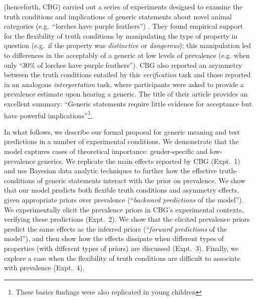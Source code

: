 \documentclass[10pt,letterpaper]{article}
\begin{document}
 (henceforth, CBG) carried out a series of experiments designed to examine the truth conditions and implications of generic statements about novel animal categories (e.g.~``lorches have purple feathers'') . 
They found empirical support for the flexibility of truth conditions by manipulating the type of property in question (e.g.~if the property was \emph{distinctive} or \emph{dangerous}); this manipulation led to differences in the acceptably of a generic at low levels of prevalence (e.g. when only ``30\% of lorches have purple feathers'').
%
CBG also reported an asymmetry between the truth conditions entailed by this \emph{verification} task and those reported in an analogous \emph{interpretation} task, where participants were asked to provide a prevalence estimate upon hearing a generic. The title of their article provides an excellent summary: ``Generic statements require little evidence for acceptance but have powerful implications''\footnote{These basics findings were also replicated in young children\cite{Brandone2014}}.

In what follows, we describe our formal proposal for generic meaning and test predictions in a number of experimental conditions. We demonstrate that the model captures cases of theoretical importance: gender-specific and low-prevalence generics. We replicate the main effects reported by CBG (Expt.~1) and use Bayesian data analytic techniques to further how the effective truth-conditions of generic statements interact with the prior on prevalence. We show that our model predicts both flexible truth conditions and asymmetry effects, given appropriate priors over prevalence (``\emph{backward predictions} of the model''). We experimentally elicit the prevalence priors in CBG's experimental contexts, verifying these predictions (Expt.~2). We show that the elicited prevalence priors predict the same effects as the inferred priors (``\emph{forward predictions} of the model''), and then show how the effects dissipate when different types of properties (with different types of priors) are discussed (Expt.~3). Finally, we explore a case when the flexibility of truth conditions are difficult to associate with prevalence (Expt.~4). 
\end{document}
